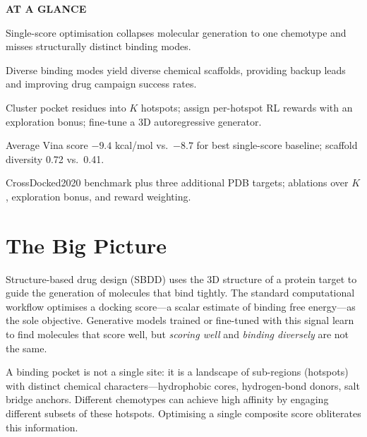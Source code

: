 \documentclass[10pt,twocolumn]{article}
\begin{document}
\begin{mdframed}[backgroundcolor=boxgray,linecolor=rulered,linewidth=1pt,
    innerleftmargin=6pt,innerrightmargin=6pt,
    innertopmargin=6pt,innerbottommargin=6pt]
\textbf{\small AT A GLANCE}\par\vspace{4pt}
\begin{description}[leftmargin=0pt,labelsep=4pt,itemsep=2pt,parsep=0pt,
    font=\small\bfseries]
  \item[Problem:] Single-score optimisation collapses molecular generation to one chemotype and misses structurally distinct binding modes.
  \item[Why it matters:] Diverse binding modes yield diverse chemical scaffolds, providing backup leads and improving drug campaign success rates.
  \item[Method:] Cluster pocket residues into $K$ hotspots; assign per-hotspot RL rewards with an exploration bonus; fine-tune a 3D autoregressive generator.
  \item[Result:] Average Vina score $-9.4$ kcal/mol vs.\ $-8.7$ for best single-score baseline; scaffold diversity 0.72 vs.\ 0.41.
  \item[Evidence:] CrossDocked2020 benchmark plus three additional PDB targets; ablations over $K$, exploration bonus, and reward weighting.
\end{description}
\end{mdframed}

\section{The Big Picture}

Structure-based drug design (SBDD) uses the 3D structure of a protein target to guide the generation of molecules that bind tightly.
The standard computational workflow optimises a docking score---a scalar estimate of binding free energy---as the sole objective.
Generative models trained or fine-tuned with this signal learn to find molecules that score well, but \emph{scoring well} and \emph{binding diversely} are not the same.

A binding pocket is not a single site: it is a landscape of sub-regions (hotspots) with distinct chemical characters---hydrophobic cores, hydrogen-bond donors, salt bridge anchors.
Different chemotypes can achieve high affinity by engaging different subsets of these hotspots.
Optimising a single composite score obliterates this information.
\end{document}
